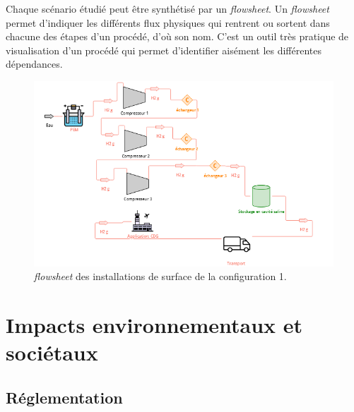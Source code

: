 \documentclass[11pt,french,a4paper]{article}
\begin{document}
Chaque scénario étudié peut être synthétisé par un \textit{flowsheet}. Un \textit{flowsheet} permet d'indiquer les différents flux physiques qui rentrent ou sortent dans chacune des étapes d'un procédé, d'où son nom. C'est un outil très pratique de visualisation d'un procédé qui permet d'identifier aisément les différentes dépendances.

\begin{figure}[!h]
\centering
\includegraphics[width=0.6\linewidth]{image/chap3/figure2_chap2.4.png}
\caption{ \textit{flowsheet} des installations de surface de la configuration 1.}
\end{figure}










\section{Impacts environnementaux et sociétaux}
\subsection{Réglementation}
\end{document}
